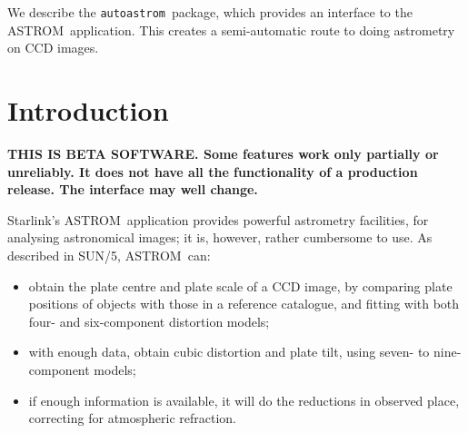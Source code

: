 \documentclass[twoside,11pt]{article}
\newcommand{\stardocinitials}  {SUN}
\newcommand{\stardocnumber}    {242.1}
\newcommand{\stardocname}{\stardocinitials /\stardocnumber}
\newenvironment{latexonly}{}{}
\newcommand{\xref}[3]{#1}
\newcommand{\xlabel}[1]{}
\newcommand{\latexonlytoc}[0]{\tableofcontents}
\newcommand{\ASTROM}{{\footnotesize ASTROM}\normalsize}
\newcommand{\ASTROMref}{\xref{{\footnotesize ASTROM}}{sun5}{}}
\newcommand{\autoastrom}{\texttt{autoastrom}}
\renewcommand{\thepage}{\roman{page}}
\begin{document}
We describe the \autoastrom\ package, which provides an interface to the
\ASTROM\ application. This creates a semi-automatic route to doing astrometry
on CCD images.

 \newpage
 \begin{latexonly}
   \setlength{\parskip}{0mm}
   \latexonlytoc
   \setlength{\parskip}{\medskipamount}
   \markboth{\stardocname}{\stardocname}
 \end{latexonly}
\cleardoublepage
\renewcommand{\thepage}{\arabic{page}}
\setcounter{page}{1}


\section{\xlabel{se_intro}Introduction\label{se:intro}}

\textbf{THIS IS BETA SOFTWARE. Some features work only partially or
  unreliably. It does not have all the functionality of a production
  release. The interface may well change.}

Starlink's \ASTROMref\ application provides powerful astrometry facilities, for
analysing astronomical images; it is, however, rather cumbersome to use. As
described in SUN/5, \ASTROM\ can:

\begin{itemize}
\item obtain the plate centre and plate scale of a CCD image, by comparing
  plate positions of objects with those in a reference catalogue, and fitting
  with both four- and six-component distortion models;
\item with enough data, obtain cubic distortion and plate tilt, using seven-
  to nine-component models;
\item if enough information is available, it will do the reductions in
  observed place, correcting for atmospheric refraction.
\end{itemize}
\end{document}
